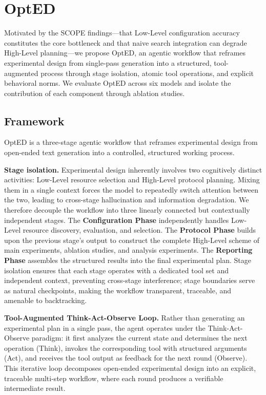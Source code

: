 \documentclass[letterpaper]{article} %
\begin{document}
\section{OptED}

Motivated by the \textsc{SCOPE} findings---that Low-Level configuration accuracy constitutes the core bottleneck and that naive search integration can degrade High-Level planning---we propose OptED, an agentic workflow that reframes experimental design from single-pass generation into a structured, tool-augmented process through stage isolation, atomic tool operations, and explicit behavioral norms. We evaluate OptED across six models and isolate the contribution of each component through ablation studies.

\subsection{Framework}
OptED is a three-stage agentic workflow that reframes experimental design from open-ended text generation into a controlled, 
structured working process. 

\textbf{Stage isolation.} Experimental design inherently involves two cognitively distinct activities: Low-Level resource selection and High-Level protocol planning.
Mixing them in a single context forces the model to repeatedly switch attention between the two, leading to cross-stage
hallucination and information degradation. We therefore decouple the workflow into three linearly connected but contextually
independent stages. The \textbf{Configuration Phase} independently handles Low-Level resource discovery, evaluation, and selection. The \textbf{Protocol Phase} builds upon the previous stage's output to construct the complete High-Level scheme of main
experiments, ablation studies, and analysis experiments. The \textbf{Reporting Phase} assembles the structured results into the
final experimental plan. Stage isolation ensures that each stage operates with a dedicated tool set and independent context,
preventing cross-stage interference; stage boundaries serve as natural checkpoints, making the workflow transparent, traceable,
and amenable to backtracking.

\textbf{Tool-Augmented Think-Act-Observe Loop.} Rather than generating an experimental plan in a single pass, the agent operates under the Think-Act-Observe paradigm: 
it first analyzes the current state and determines the next operation (Think), invokes the corresponding tool with structured arguments (Act), 
and receives the tool output as feedback for the next round (Observe). This iterative loop decomposes open-ended experimental design into an 
explicit, traceable multi-step workflow, where each round produces a verifiable intermediate result.
\end{document}
